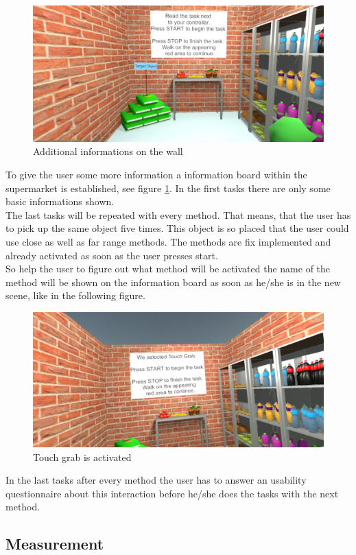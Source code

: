 \begin{figure}[H] 
	\center 
	\includegraphics[width=12cm]{Images/TaskWall_1.PNG}
	\caption[Additional informations on the wall]{Additional informations on the wall}
	\label{fig:taskW1}
\end{figure}

To give the user some more information a information board within the supermarket is established, see figure \ref{fig:taskW1}. In the first tasks there are only some basic informations shown.\\
The last tasks will be repeated with every method. That means, that the user has to pick up the same object five times. This object is so placed that the user could use close as well as far range methods. The methods are fix implemented and already activated as soon as the user presses start. \\
So help the user to figure out what method will be activated the name of the method will be shown on the information board as soon as  he/she is in the new scene, like in the following figure. 

\begin{figure}[H] 
	\center 
	\includegraphics[width=12cm]{Images/TaskWall_2.PNG}
	\caption[Touch grab is activated]{Touch grab is activated}
	\label{fig:taskW2}
\end{figure}

In the last tasks after every method the user has to answer an usability questionnaire about this interaction before he/she does the tasks with the next method. \\

\subsection{Measurement} \label{sec:measurement}



\newpage